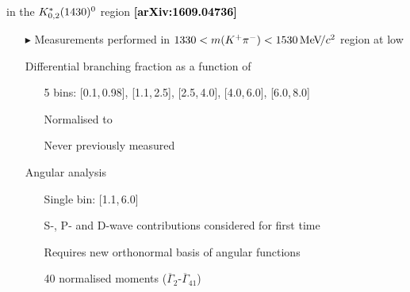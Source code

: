 \documentclass[aspectratio=1610]{beamer}
\def\Kstarfourteenthirty  {{\ensuremath{\kaon^{*}_{0,2}(1430)^{0}}}\xspace}
\begin{document}
\begin{frame}{\BdToKpimm in the \Kstarfourteenthirty region \hspace{0pt plus 1 filll} {\small \bf \textcolor{black}{[arXiv:1609.04736]}}}
\begin{itemize}
\item[$\blacktriangleright$] Measurements performed in $1330<m({{K}^+}{{\pi}^-})<1530{\mathrm{\,Me\kern -0.1em V\!/}c^2}$ region at low \qsq
\item[]
\item[\ding{182}] Differential branching fraction as a function of \qsq
  \begin{itemize}
    \item[\ding{70}] 5 \qsq bins: [0.1,\,0.98], [1.1,\,2.5], [2.5,\,4.0], [4.0,\,6.0], [6.0,\,8.0]~\gevgevcccc
    \item[\ding{70}] Normalised to \BdToJPsiKstP
    \item[\ding{70}] Never previously measured
  \end{itemize}
\item[\ding{183}] Angular analysis
  \begin{itemize}
    \item[\ding{70}] Single \qsq bin: [1.1,\,6.0]~\gevgevcccc
    \item[\ding{70}] S-, P- and D-wave contributions considered for first time
    \item[\ding{70}] Requires new orthonormal basis of angular functions 
    \item[\ding{70}] 40 normalised moments ($\overline{\Gamma}_{2}$-$\overline{\Gamma}_{41}$)
  \end{itemize}
  
\end{itemize}
\end{frame}
\end{document}
